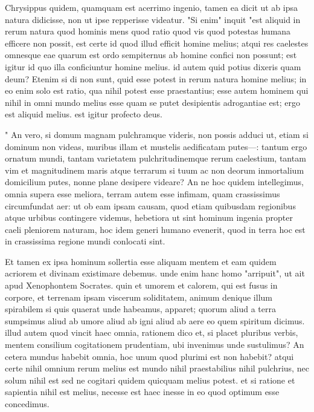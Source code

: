  Chrysippus quidem, quamquam est acerrimo ingenio, tamen ea dicit ut ab ipsa natura didicisse, non ut ipse repperisse videatur. "Si enim" inquit "est aliquid in rerum natura quod hominis mens quod ratio quod vis quod potestas humana efficere non possit, est certe id quod illud efficit homine melius; atqui res caelestes omnesque eae quarum est ordo sempiternus ab homine confici non possunt; est igitur id quo illa conficiuntur homine melius. id autem quid potius dixeris quam deum? Etenim si di non sunt, quid esse potest in rerum natura homine melius; in eo enim solo est ratio, qua nihil potest esse praestantius; esse autem hominem qui nihil in omni mundo melius esse quam se putet desipientis adrogantiae est; ergo est aliquid melius. est igitur profecto deus.

 " An vero, si domum magnam pulchramque videris, non possis adduci ut, etiam si dominum non videas, muribus illam et mustelis aedificatam putes—: tantum ergo ornatum mundi, tantam varietatem pulchritudinemque rerum caelestium, tantam vim et magnitudinem maris atque terrarum si tuum ac non deorum inmortalium domicilium putes, nonne plane desipere videare? An ne hoc quidem intellegimus, omnia supera esse meliora, terram autem esse infimam, quam crassissimus circumfundat aer: ut ob eam ipsam causam, quod etiam quibusdam regionibus atque urbibus contingere videmus, hebetiora ut sint hominum ingenia propter caeli pleniorem naturam, hoc idem generi humano evenerit, quod in terra hoc est in crassissima regione mundi conlocati sint.

 Et tamen ex ipsa hominum sollertia esse aliquam mentem et eam quidem acriorem et divinam existimare debemus. unde enim hanc homo "arripuit", ut ait apud Xenophontem Socrates. quin et umorem et calorem, qui est fusus in corpore, et terrenam ipsam viscerum soliditatem, animum denique illum spirabilem si quis quaerat unde habeamus, apparet; quorum aliud a terra sumpsimus aliud ab umore aliud ab igni aliud ab aere eo quem spiritum dicimus. illud autem quod vincit haec omnia, rationem dico et, si placet pluribus verbis, mentem consilium cogitationem prudentiam, ubi invenimus unde sustulimus? An cetera mundus habebit omnia, hoc unum quod plurimi est non habebit? atqui certe nihil omnium rerum melius est mundo nihil praestabilius nihil pulchrius, nec solum nihil est sed ne cogitari quidem quicquam melius potest. et si ratione et sapientia nihil est melius, necesse est haec inesse in eo quod optimum esse concedimus.

